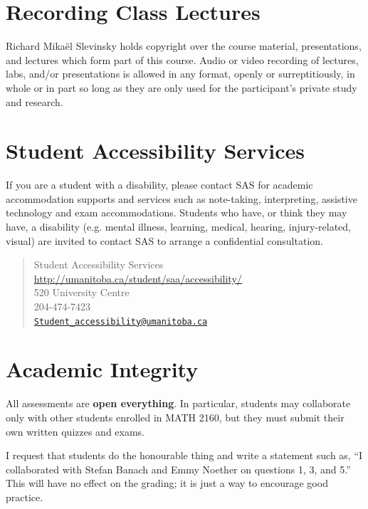 \documentclass[12pt]{article}
\begin{document}
\section{Recording Class Lectures}

Richard Mika\"el Slevinsky holds copyright over the course material, presentations, and lectures which form part of this course. Audio or video recording of lectures, labs, and/or presentations is allowed in any format, openly or surreptitiously, in whole or in part so long as they are only used for the participant's private study and research.

\section{Student Accessibility Services}

If you are a student with a disability, please contact SAS for academic accommodation supports and services such as note-taking, interpreting, assistive technology and exam accommodations. Students who have, or think they may have, a disability (e.g. mental illness, learning, medical, hearing, injury-related, visual) are invited to contact SAS to arrange a confidential consultation. 

\begin{quote}
Student Accessibility Services \url{http://umanitoba.ca/student/saa/accessibility/} \\
520 University Centre \\
204-474-7423 \\
\href{mailto:Student_accessibility@umanitoba.ca}{\texttt{Student\_accessibility@umanitoba.ca}}
\end{quote}

\section{Academic Integrity}

All assessments are {\bf open everything}. In particular, students may collaborate only with other students enrolled in MATH 2160, but they must submit their own written quizzes and exams.

I request that students do the honourable thing and write a statement such as, ``I collaborated with Stefan Banach and Emmy Noether on questions 1, 3, and 5.'' This will have no effect on the grading; it is just a way to encourage good practice.
\end{document}
